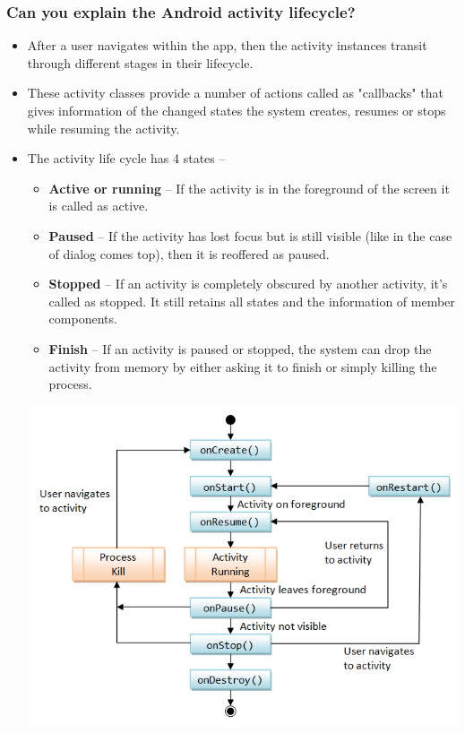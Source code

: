\documentclass[9pt, b5paper]{article}
\begin{document}
\subsubsection{Can you explain the Android activity lifecycle?}
\label{sec-1-2-2}
\begin{itemize}
\item After a user navigates within the app, then the activity instances transit through different stages in their lifecycle.
\item These activity classes provide a number of actions called as "callbacks" that gives information of the changed states the system creates, resumes or stops while resuming the activity.
\item The activity life cycle has 4 states –
\begin{itemize}
\item \textbf{Active or running} – If the activity is in the foreground of the screen it is called as active.
\item \textbf{Paused} – If the activity has lost focus but is still visible (like in the case of dialog comes top), then it is reoffered as paused.
\item \textbf{Stopped} – If an activity is completely obscured by another activity, it's called as stopped. It still retains all states and the information of member components.
\item \textbf{Finish} – If an activity is paused or stopped, the system can drop the activity from memory by either asking it to finish or simply killing the process.
\end{itemize}
\includegraphics[width=.9\linewidth]{./pic/activityLifeCycle2.png}


\end{itemize}
\end{document}
